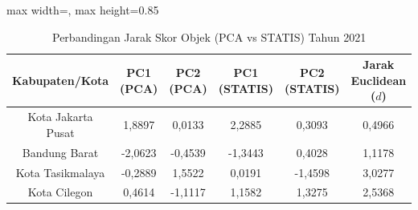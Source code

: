\begin{table}[H]
\centering
\caption{Perbandingan Jarak Skor Objek (PCA vs STATIS) Tahun 2021} \label{tab:sample2jarak_skor_2021}
\begin{adjustbox}{max width=\textwidth, max height=0.85\textheight}
\begin{tabular}{|c|c|c|c|c|c|}
\hline
\textbf{Kabupaten/Kota} & \textbf{PC1 (PCA)} & \textbf{PC2 (PCA)} & \textbf{PC1 (STATIS)} & \textbf{PC2 (STATIS)} & \textbf{Jarak Euclidean ($d$)} \\
\hline
Kota Jakarta Pusat & 1,8897 & 0,0133 & 2,2885 & 0,3093 & 0,4966 \\
Bandung Barat & -2,0623 & -0,4539 & -1,3443 & 0,4028 & 1,1178 \\
Kota Tasikmalaya & -0,2889 & 1,5522 & 0,0191 & -1,4598 & 3,0277 \\
Kota Cilegon & 0,4614 & -1,1117 & 1,1582 & 1,3275 & 2,5368 \\
\hline
\end{tabular}
\end{adjustbox}
\end{table}
